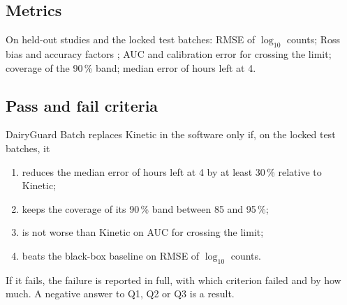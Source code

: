 \subsection{Metrics}
On held-out studies and the locked test batches: RMSE of $\log_{10}$ counts; Ross bias and accuracy factors \cite{ross1996}; AUC and calibration error for crossing the limit; coverage of the 90\,\% band; median error of hours left at 4\degC.

\subsection{Pass and fail criteria}
DairyGuard Batch replaces Kinetic in the software only if, on the locked test batches, it
\begin{enumerate}
\item reduces the median error of hours left at 4\degC{} by at least 30\,\% relative to Kinetic;
\item keeps the coverage of its 90\,\% band between 85 and 95\,\%;
\item is not worse than Kinetic on AUC for crossing the limit;
\item beats the black-box baseline on RMSE of $\log_{10}$ counts.
\end{enumerate}
If it fails, the failure is reported in full, with which criterion failed and by how much. A negative answer to Q1, Q2 or Q3 is a result.



